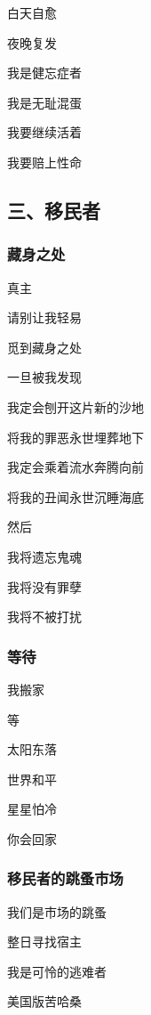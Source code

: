 \documentclass[openany,scheme = chinese, linespread = 1.5]{ctexbook}
\begin{document}
\begin{center}
白天自愈

夜晚复发

我是健忘症者

我是无耻混蛋

我要继续活着

我要赔上性命
\end{center}

\subsection*{三、移民者}

\subsubsection*{藏身之处}

\begin{center}
真主

请别让我轻易

觅到藏身之处

一旦被我发现

我定会刨开这片新的沙地

将我的罪恶永世埋葬地下

我定会乘着流水奔腾向前

将我的丑闻永世沉睡海底

然后

我将遗忘鬼魂

我将没有罪孽

我将不被打扰
\end{center}

\subsubsection*{等待} 

\begin{center}
我搬家

等

太阳东落

世界和平 

星星怕冷

你会回家
\end{center}

\subsubsection*{移民者的跳蚤市场}

\begin{center}
 我们是市场的跳蚤
 
整日寻找宿主

我是可怜的逃难者

 美国版苦哈桑
\end{center}
\end{document}
